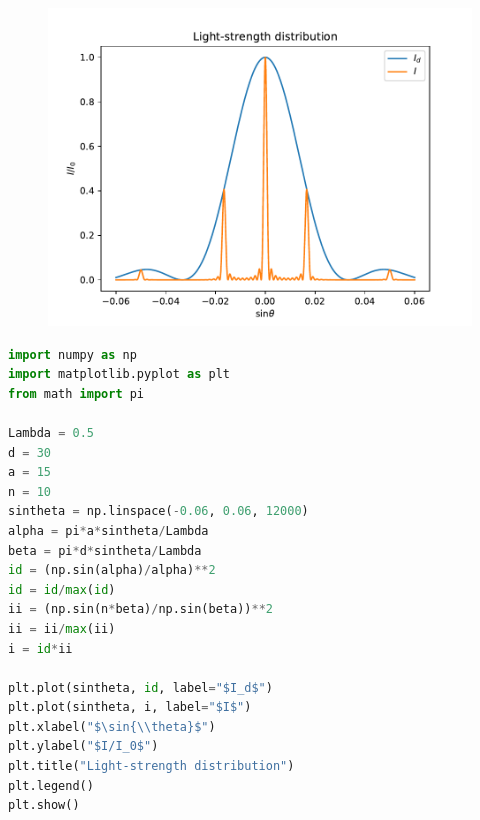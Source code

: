 \documentclass{article}
\begin{document}
\begin{figure}[!ht]
    \centering
    \includegraphics[width=15cm]{FRP.pdf}
\end{figure}

\begin{lstlisting}[language={python}]
import numpy as np
import matplotlib.pyplot as plt
from math import pi

Lambda = 0.5
d = 30
a = 15
n = 10
sintheta = np.linspace(-0.06, 0.06, 12000)
alpha = pi*a*sintheta/Lambda
beta = pi*d*sintheta/Lambda
id = (np.sin(alpha)/alpha)**2
id = id/max(id)
ii = (np.sin(n*beta)/np.sin(beta))**2
ii = ii/max(ii)
i = id*ii

plt.plot(sintheta, id, label="$I_d$")
plt.plot(sintheta, i, label="$I$")
plt.xlabel("$\sin{\\theta}$")
plt.ylabel("$I/I_0$")
plt.title("Light-strength distribution")
plt.legend()
plt.show()
\end{lstlisting}
\end{document}
